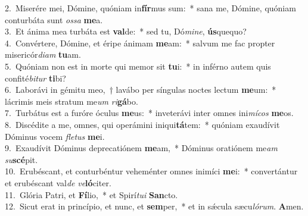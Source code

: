 {2.~}Miserére mei, Dómine, quóniam in\textbf{fír}mus sum:~* sana me, Dómine, quóniam conturbáta sunt \textit{os}\textit{sa} \textbf{me}a.\\
{3.~}Et ánima mea turbáta est \textbf{val}de:~* sed tu, Dó\textit{mi}\textit{ne}, \textbf{ús}quequo?\\
{4.~}Convértere, Dómine, et éripe ánimam \textbf{me}am:~* salvum me fac propter misericór\textit{di}\textit{am} \textbf{tu}am.\\
{5.~}Quóniam non est in morte qui memor sit \textbf{tu}i:~* in inférno autem quis confité\textit{bi}\textit{tur} \textbf{ti}bi?\\
{6.~}Laborávi in gémitu meo,~† lavábo per síngulas noctes lectum \textbf{me}um:~* lácrimis meis stratum me\textit{um} \textit{ri}\textbf{gá}bo.\\
{7.~}Turbátus est a furóre óculus \textbf{me}us:~* inveterávi inter omnes ini\textit{mí}\textit{cos} \textbf{me}os.\\
{8.~}Discédite a me, omnes, qui operámini iniqui\textbf{tá}tem:~* quóniam exaudívit Dóminus vocem \textit{fle}\textit{tus} \textbf{me}i.\\
{9.~}Exaudívit Dóminus deprecatiónem \textbf{me}am,~* Dóminus oratiónem me\textit{am} \textit{su}\textbf{scé}pit.\\
{10.~}Erubéscant, et conturbéntur veheménter omnes inimíci \textbf{me}i:~* convertántur et erubéscant val\textit{de} \textit{ve}\textbf{ló}citer.\\
{11.~}Glória Patri, et \textbf{Fí}lio,~* et Spirí\textit{tu}\textit{i} \textbf{San}cto.\\
{12.~}Sicut erat in princípio, et nunc, et \textbf{sem}per,~* et in sǽcula sæcu\textit{ló}\textit{rum}. \textbf{A}men.\\
